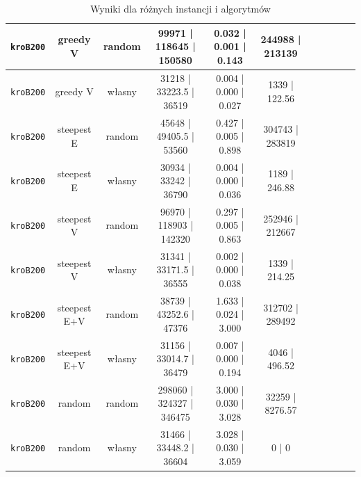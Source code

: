 \documentclass[11pt]{article}
\begin{document}
\begin{table}[ht]
\begin{tabular}{|c|c|c||c|c|c||c|c|c||c|c|}
\texttt{kroB200} & greedy V & random & 99971 | 118645 | 150580 & 0.032 | 0.001 | 0.143 & 244988 | 213139 \\ \hline
\texttt{kroB200} & greedy V & własny & 31218 | 33223.5 | 36519 & 0.004 | 0.000 | 0.027 & 1339 | 122.56 \\ \hline
\texttt{kroB200} & steepest E & random & 45648 | 49405.5 | 53560 & 0.427 | 0.005 | 0.898 & 304743 | 283819 \\ \hline
\texttt{kroB200} & steepest E & własny & 30934 | 33242 | 36790 & 0.004 | 0.000 | 0.036 & 1189 | 246.88 \\ \hline
\texttt{kroB200} & steepest V & random & 96970 | 118903 | 142320 & 0.297 | 0.005 | 0.863 & 252946 | 212667 \\ \hline
\texttt{kroB200} & steepest V & własny & 31341 | 33171.5 | 36555 & 0.002 | 0.000 | 0.038 & 1339 | 214.25 \\ \hline
\texttt{kroB200} & steepest E+V & random & 38739 | 43252.6 | 47376 & 1.633 | 0.024 | 3.000 & 312702 | 289492 \\ \hline
\texttt{kroB200} & steepest E+V & własny & 31156 | 33014.7 | 36479 & 0.007 | 0.000 | 0.194 & 4046 | 496.52 \\ \hline
\texttt{kroB200} & random & random & 298060 | 324327 | 346475 & 3.000 | 0.030 | 3.028 & 32259 | 8276.57 \\ \hline
\texttt{kroB200} & random & własny & 31466 | 33448.2 | 36604 & 3.028 | 0.030 | 3.059 & 0 | 0 \\ \hline
\end{tabular}
\caption{Wyniki dla różnych instancji i algorytmów}\label{tab:table}
\end{table}
\end{document}
